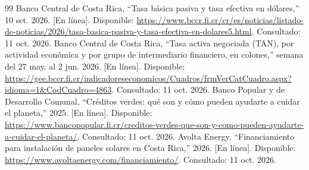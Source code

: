 \documentclass[10pt,letterpaper]{article}
\begin{document}
\begin{thebibliography}{99}
 Banco Central de Costa Rica, ``Tasa básica pasiva y tasa efectiva en dólares,'' 10 set. 2026. [En línea]. Disponible: \url{https://www.bccr.fi.cr/cr/es/noticias/listado-de-noticias/2026/tasa-basica-pasiva-y-tasa-efectiva-en-dolares5.html}. Consultado: 11 oct. 2026.
 Banco Central de Costa Rica, ``Tasa activa negociada (TAN), por actividad económica y por grupo de intermediario financiero, en colones,'' semana del 27 may. al 2 jun. 2026. [En línea]. Disponible: \url{https://gee.bccr.fi.cr/indicadoreseconomicos/Cuadros/frmVerCatCuadro.aspx?idioma=1&CodCuadro=4863}. Consultado: 11 oct. 2026.
 Banco Popular y de Desarrollo Comunal, ``Créditos verdes: qué son y cómo pueden ayudarte a cuidar el planeta,'' 2025. [En línea]. Disponible: \url{https://www.bancopopular.fi.cr/creditos-verdes-que-son-y-como-pueden-ayudarte-a-cuidar-el-planeta/}. Consultado: 11 oct. 2026.
 Avolta Energy, ``Financiamiento para instalación de paneles solares en Costa Rica,'' 2026. [En línea]. Disponible: \url{https://www.avoltaenergy.com/financiamiento/}. Consultado: 11 oct. 2026.
\end{thebibliography}
\end{document}
